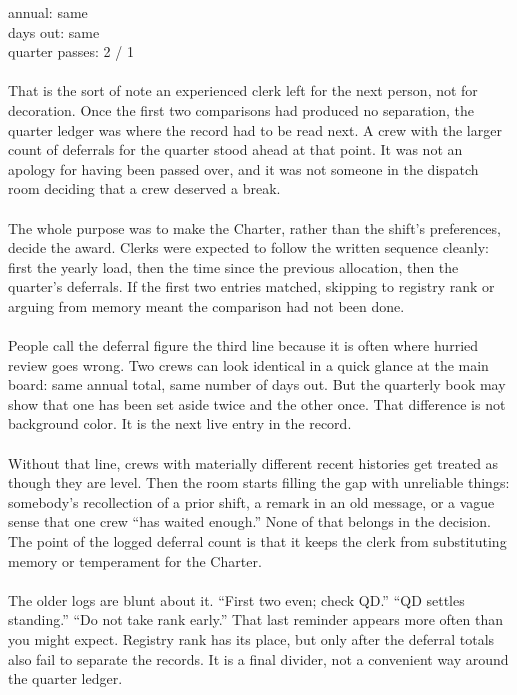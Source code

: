 \documentclass[9pt]{article}
\begin{document}
\begin{minipage}[t]{\textwidth}
\begin{minipage}[t]{0.49\textwidth}
\begin{exbox}
{  annual: same \\
  days out: same \\
  quarter passes: 2 / 1 \\
  \  \\
  That is the sort of note an experienced clerk left for the next person, not for decoration. Once the first two comparisons had produced no separation, the quarter ledger was where the record had to be read next. A crew with the larger count of deferrals for the quarter stood ahead at that point. It was not an apology for having been passed over, and it was not someone in the dispatch room deciding that a crew deserved a break. \\
  \  \\
  The whole purpose was to make the Charter, rather than the shift's preferences, decide the award. Clerks were expected to follow the written sequence cleanly: first the yearly load, then the time since the previous allocation, then the quarter's deferrals. If the first two entries matched, skipping to registry rank or arguing from memory meant the comparison had not been done. \\
  \  \\
  People call the deferral figure the third line because it is often where hurried review goes wrong. Two crews can look identical in a quick glance at the main board: same annual total, same number of days out. But the quarterly book may show that one has been set aside twice and the other once. That difference is not background color. It is the next live entry in the record. \\
  \  \\
  Without that line, crews with materially different recent histories get treated as though they are level. Then the room starts filling the gap with unreliable things: somebody's recollection of a prior shift, a remark in an old message, or a vague sense that one crew ``has waited enough.'' None of that belongs in the decision. The point of the logged deferral count is that it keeps the clerk from substituting memory or temperament for the Charter. \\
  \  \\
  The older logs are blunt about it. ``First two even; check QD.'' ``QD settles standing.'' ``Do not take rank early.'' That last reminder appears more often than you might expect. Registry rank has its place, but only after the deferral totals also fail to separate the records. It is a final divider, not a convenient way around the quarter ledger. \\
}
\end{exbox}
\end{minipage}
\end{minipage}
\end{document}
